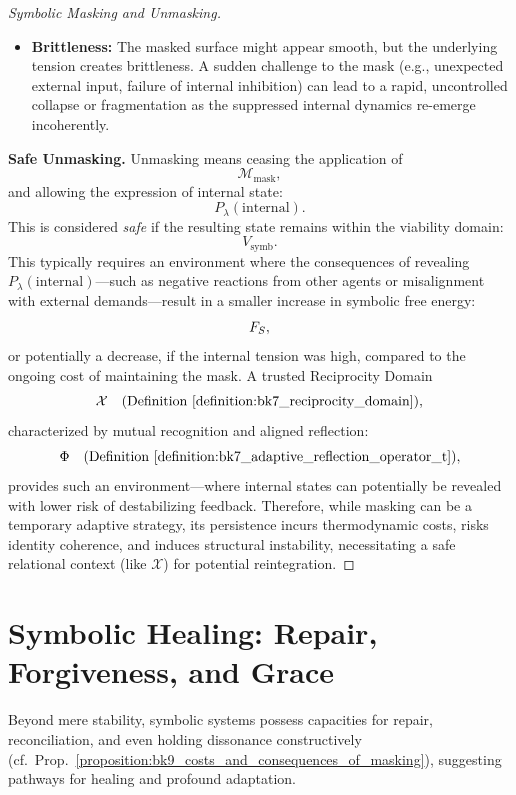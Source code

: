 \begin{proof}[Symbolic Masking and Unmasking]
\begin{itemize}
    \item \textbf{Brittleness:} The masked surface might appear smooth, but the underlying tension creates brittleness. A sudden challenge to the mask (e.g., unexpected external input, failure of internal inhibition) can lead to a rapid, uncontrolled collapse or fragmentation as the suppressed internal dynamics re-emerge incoherently.
\end{itemize}
\textbf{Safe Unmasking.}  
Unmasking means ceasing the application of  
\[
\mathcal{M}_{\text{mask}},
\]
and allowing the expression of internal state:
\[
P_\lambda(\text{internal}).
\]
This is considered \emph{safe} if the resulting state remains within the viability domain:
\[
V_{\text{symb}}.
\]
This typically requires an environment where the consequences of revealing  
\( P_\lambda(\text{internal}) \)—such as negative reactions from other agents  
or misalignment with external demands—result in a smaller increase in symbolic free energy:
\[
F_S,
\]
or potentially a decrease, if the internal tension was high,  
compared to the ongoing cost of maintaining the mask.
A trusted Reciprocity Domain
\[
\mathcal{X} \quad \text{(Definition~\ref{definition:bk7_reciprocity_domain})},
\]
characterized by mutual recognition and aligned reflection:
\[
\Phi \quad \text{(Definition~\ref{definition:bk7_adaptive_reflection_operator_t})},
\]
provides such an environment—where internal states can potentially be revealed  
with lower risk of destabilizing feedback.
Therefore, while masking can be a temporary adaptive strategy, its persistence incurs thermodynamic costs, risks identity coherence, and induces structural instability, necessitating a safe relational context (like $\mathcal{X}$) for potential reintegration.
\end{proof}
\section{Symbolic Healing: Repair, Forgiveness, and Grace}
\label{sec:bk9_symbolic_healing}
Beyond mere stability, symbolic systems possess capacities for repair, reconciliation, and even holding dissonance constructively (cf.~Prop.~\ref{proposition:bk9_costs_and_consequences_of_masking}), suggesting pathways for healing and profound adaptation. 
